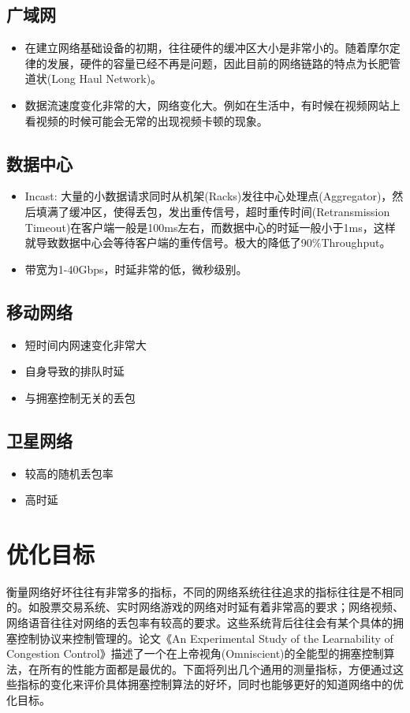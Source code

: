 \documentclass[a4paper, 12pt, UTF8]{ctexart}
\begin{document}
\subsection{广域网}
\begin{itemize}
	\item 在建立网络基础设备的初期，往往硬件的缓冲区大小是非常小的。随着摩尔定律的发展，硬件的容量已经不再是问题，因此目前的网络链路的特点为长肥管道状(Long Haul Network)。\cite{BDP}
	\item 数据流速度变化非常的大，网络变化大。例如在生活中，有时候在视频网站上看视频的时候可能会无常的出现视频卡顿的现象。
\end{itemize}

\subsection{数据中心}

\begin{itemize}
	\item Incast: 大量的小数据请求同时从机架(Racks)发往中心处理点(Aggregator)，然后填满了缓冲区，使得丢包，发出重传信号，超时重传时间(Retransmission Timeout)在客户端一般是100ms左右，而数据中心的时延一般小于1ms，这样就导致数据中心会等待客户端的重传信号。极大的降低了90\%Throughput。
	\item 带宽为1-40Gbps，时延非常的低，微秒级别。
\end{itemize}

\subsection{移动网络}

\begin{itemize}
	\item 短时间内网速变化非常大
	\item 自身导致的排队时延
	\item 与拥塞控制无关的丢包
\end{itemize}

\subsection{卫星网络}
\begin{itemize}
	\item 较高的随机丢包率
	\item 高时延
\end{itemize}

\clearpage

\section{优化目标}
\par 衡量网络好坏往往有非常多的指标，不同的网络系统往往追求的指标往往是不相同的。如股票交易系统、实时网络游戏的网络对时延有着非常高的要求；网络视频、网络语音往往对网络的丢包率有较高的要求。这些系统背后往往会有某个具体的拥塞控制协议来控制管理的。论文《An Experimental Study of the Learnability of Congestion Control》\cite{DBLP:conf/sigcomm/SivaramanWTB14}描述了一个在上帝视角(Omniscient)的全能型的拥塞控制算法，在所有的性能方面都是最优的。下面将列出几个通用的测量指标，方便通过这些指标的变化来评价具体拥塞控制算法的好坏，同时也能够更好的知道网络中的优化目标。
\end{document}
